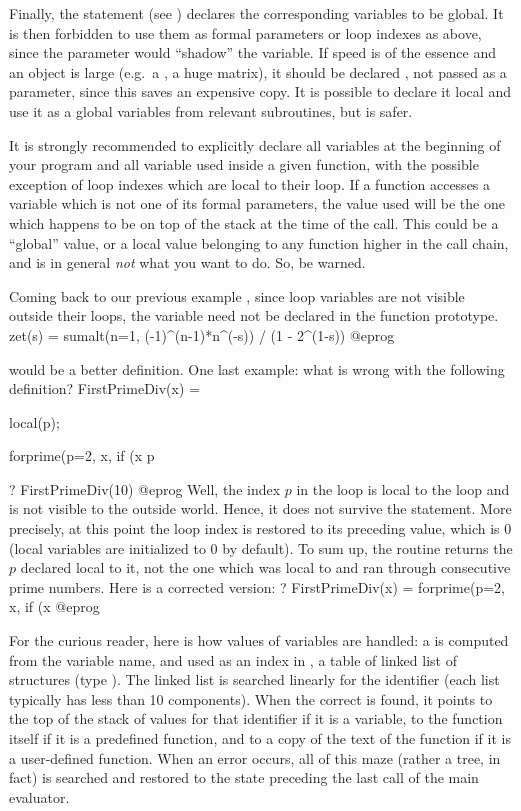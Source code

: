 Finally, the statement  (see
) declares the corresponding variables to be global. It is
then forbidden to use them as formal parameters or loop indexes as above,
since the parameter would ``shadow'' the variable. If speed is of the essence
and an object is large (e.g.~a , a huge matrix), it should be
declared , not passed as a parameter, since this saves an
expensive copy. It is possible to declare it local and use it as a global
variables from relevant subroutines, but  is safer.

It is strongly recommended to explicitly declare all  variables
at the beginning of your program and all  variable used inside a
given function, with the possible exception of loop indexes which are local
to their loop. If a function accesses a variable which is not one of its
formal parameters, the value used will be the one which happens to be on top
of the stack at the time of the call. This could be a ``global'' value, or a
local value belonging to any function higher in the call chain, and is in
general \emph{not} what you want to do. So, be warned.


Coming back to our previous example , since loop variables are not
visible outside their loops, the variable  need not be declared in the
function prototype.
\bprog
zet(s) = sumalt(n=1, (-1)^(n-1)*n^(-s)) / (1 - 2^(1-s))
@eprog

\noindent would be a better definition. One last example: what is
wrong with the following definition?
\bprog
FirstPrimeDiv(x) =
{ local(p);

  forprime(p=2, x, if (x%
  p
}
? FirstPrimeDiv(10)
@eprog
\noindent Well, the index $p$ in the  loop is local to
the loop and is not visible to the outside world. Hence, it does not survive
the  statement. More precisely, at this point the loop index is
restored to its preceding value, which is 0 (local variables are
initialized to 0 by default). To sum up, the routine returns the $p$
declared local to it, not the one which was local to  and ran
through consecutive prime numbers. Here is a corrected version:
\bprog
? FirstPrimeDiv(x) = forprime(p=2, x, if (x%
@eprog

 For the curious reader, here is how values
of variables are handled: a  is computed from the
variable name, and used as an index in , a table of linked
list of structures (type ). The linked list is searched linearly
for the identifier (each list typically has less than 10 components). When
the correct  is found, it points to the top of the stack of
values for that identifier if it is a variable, to the function itself if it
is a predefined function, and to a copy of the text of the function if it is
a user-defined function. When an error occurs, all of this maze (rather a
tree, in fact) is searched and restored to the state preceding the last call
of the main evaluator.

